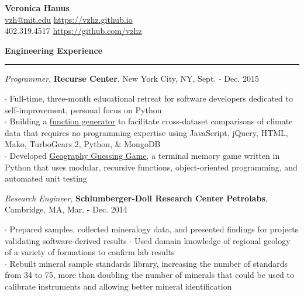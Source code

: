 \documentclass[11pt]{article}
\begin{document}
\bigskip
\begin{flushleft}
\LARGE{\textbf{Veronica Hanus}} \\
\large{\href{mailto:vzh@mit.edu}{vzh@mit.edu}} \hspace{0.05in} \normalsize{\url{https://vzhz.github.io}} \\
\normalsize{402.319.4517} \hspace{0.13in} \normalsize{\url{https://github.com/vzhz}} \\
\end{flushleft}
\smallskip

\vspace*{0.25 mm}
\textbf{Engineering Experience}
\smallskip
\hrule
\emph{Programmer}, \textbf {Recurse Center}, New York City, NY, Sept. - Dec. 2015 \\ 
\begin{small}$\cdot$ {Full-time, three-month educational retreat for software developers dedicated to self-improvement, personal focus on Python}\\ 
$\cdot$ {Building a \href{https://github.com/vzhz/function_generator/blob/master/README.md}{function generator} to facilitate cross-dataset comparisons of climate data that requires no programming expertise using JavaScript, jQuery, HTML, Mako, TurboGears 2, Python, \& MongoDB}\\
$\cdot$ {Developed \href{https://github.com/vzhz/geography_guessing_game/blob/master/README.md}{Geography Guessing Game}, a terminal memory game written in Python that uses modular, recursive functions, object-oriented programming, and automated unit testing}\end{small}

\smallskip
\emph{Research Engineer}, \textbf {Schlumberger-Doll Research Center Petrolabs}, Cambridge, MA, Mar. - Dec. 2014 \\ 
\begin{small}$\cdot$ {Prepared samples, collected mineralogy data, and presented findings for projects validating software-derived results}
$\cdot$ {Used domain knowledge of regional geology of a variety of formations to confirm lab results}\\
$\cdot$ {Rebuilt mineral sample standards library, increasing the number of standards from 34 to 75, more than doubling the number of minerals that could be used to calibrate instruments and allowing better mineral identification}\end{small} 
\end{document}
